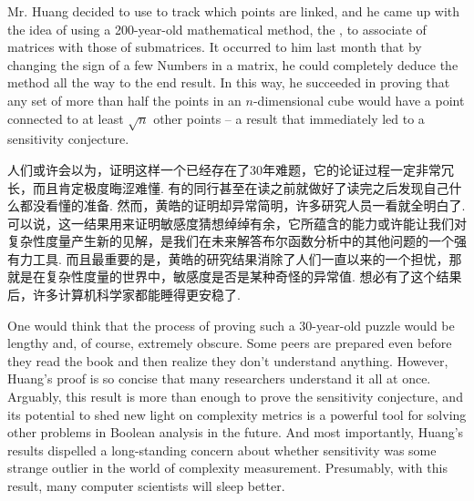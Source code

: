 \begin{multicols}{2}
    Mr. Huang decided to use  to track which points are linked, and he came up with the idea of using a 200-year-old mathematical method, the , to associate  of matrices with those of submatrices. It occurred to him last month that by changing the sign of a few Numbers in a matrix, he could completely deduce the method all the way to the end result. In this way, he succeeded in proving that any set of more than half the points in an $n$-dimensional cube would have a point connected to at least $\sqrt{n}$ other points -- a result that immediately led to a sensitivity conjecture. 
    
    人们或许会以为，证明这样一个已经存在了30年难题，它的论证过程一定非常冗长，而且肯定极度晦涩难懂. 有的同行甚至在读之前就做好了读完之后发现自己什么都没看懂的准备. 然而，黄皓的证明却异常简明，许多研究人员一看就全明白了. 可以说，这一结果用来证明敏感度猜想绰绰有余，它所蕴含的能力或许能让我们对复杂性度量产生新的见解，是我们在未来解答布尔函数分析中的其他问题的一个强有力工具. 而且最重要的是，黄皓的研究结果消除了人们一直以来的一个担忧，那就是在复杂性度量的世界中，敏感度是否是某种奇怪的异常值. 想必有了这个结果后，许多计算机科学家都能睡得更安稳了. 
    
    One would think that the process of proving such a 30-year-old puzzle would be lengthy and, of course, extremely obscure. Some peers are prepared even before they read the book and then realize they don't understand anything. However, Huang's proof is so concise that many researchers understand it all at once. Arguably, this result is more than enough to prove the sensitivity conjecture, and its potential to shed new light on complexity metrics is a powerful tool for solving other problems in Boolean analysis in the future. And most importantly, Huang's results dispelled a long-standing concern about whether sensitivity was some strange outlier in the world of complexity measurement. Presumably, with this result, many computer  scientists will sleep better. 
\end{multicols}
\noindent {}

